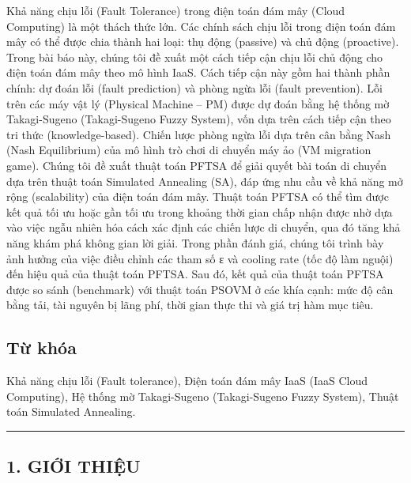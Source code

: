 \documentclass[
  vietnamese,
]{article}
\begin{document}
Khả năng chịu lỗi (Fault Tolerance) trong điện toán đám mây (Cloud
Computing) là một thách thức lớn. Các chính sách chịu lỗi trong điện
toán đám mây có thể được chia thành hai loại: thụ động (passive) và chủ
động (proactive). Trong bài báo này, chúng tôi đề xuất một cách tiếp cận
chịu lỗi chủ động cho điện toán đám mây theo mô hình IaaS. Cách tiếp cận
này gồm hai thành phần chính: dự đoán lỗi (fault prediction) và phòng
ngừa lỗi (fault prevention). Lỗi trên các máy vật lý (Physical Machine
-- PM) được dự đoán bằng hệ thống mờ Takagi-Sugeno (Takagi-Sugeno Fuzzy
System), vốn dựa trên cách tiếp cận theo tri thức (knowledge-based).
Chiến lược phòng ngừa lỗi dựa trên cân bằng Nash (Nash Equilibrium) của
mô hình trò chơi di chuyển máy ảo (VM migration game). Chúng tôi đề xuất
thuật toán PFTSA để giải quyết bài toán di chuyển dựa trên thuật toán
Simulated Annealing (SA), đáp ứng nhu cầu về khả năng mở rộng
(scalability) của điện toán đám mây. Thuật toán PFTSA có thể tìm được
kết quả tối ưu hoặc gần tối ưu trong khoảng thời gian chấp nhận được nhờ
dựa vào việc ngẫu nhiên hóa cách xác định các chiến lược di chuyển, qua
đó tăng khả năng khám phá không gian lời giải. Trong phần đánh giá,
chúng tôi trình bày ảnh hưởng của việc điều chỉnh các tham số ε và
cooling rate (tốc độ làm nguội) đến hiệu quả của thuật toán PFTSA. Sau
đó, kết quả của thuật toán PFTSA được so sánh (benchmark) với thuật toán
PSOVM ở các khía cạnh: mức độ cân bằng tải, tài nguyên bị lãng phí, thời
gian thực thi và giá trị hàm mục tiêu.

\subsection{Từ khóa}\label{tux1eeb-khuxf3a}

Khả năng chịu lỗi (Fault tolerance), Điện toán đám mây IaaS (IaaS Cloud
Computing), Hệ thống mờ Takagi-Sugeno (Takagi-Sugeno Fuzzy System),
Thuật toán Simulated Annealing.

\begin{center}\rule{0.5\linewidth}{0.5pt}\end{center}

\subsection{1. GIỚI THIỆU}\label{giux1edbi-thiux1ec7u}
\end{document}
